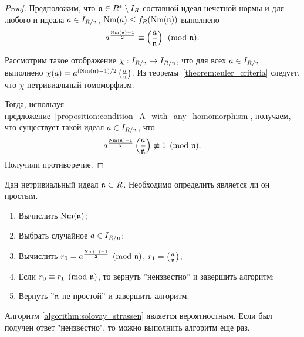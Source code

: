 \documentclass[_00_dissertation.tex]{subfiles}
\begin{document}
\begin{proof}
    Предположим, что $\mathfrak{n} \in R^{*} \setminus I_{R}$ составной идеал нечетной нормы и для любого и идеала $a \in I_{R/\mathfrak{n}}$, $\textrm{Nm}(a) \le f_R(\textrm{Nm}(\mathfrak{n}))$ выполнено
    \begin{equation*}
        a^{\frac{\textrm{Nm}(\mathfrak{n}) - 1}{2}} \equiv \left(\frac{a}{\mathfrak{n}}\right) \pmod{\mathfrak{n}}.
    \end{equation*}
    
    Рассмотрим такое отображение $\chi: I_{R/\mathfrak{n}} \to I_{R/\mathfrak{n}}$, что для всех $a \in I_{R/\mathfrak{n}}$ выполнено $\chi(a) = a^{(\textrm{Nm}(\mathfrak{n}) - 1)/2}\left(\frac{a}{\mathfrak{n}}\right)$.
    Из теоремы~\ref{theorem:euler_criteria} следует, что $\chi$ нетривиальный гомоморфизм.
    
    Тогда, используя предложение~\ref{proposition:condition_A_with_any_homomorphism}, получаем, что существует такой идеал $a \in I_{R/\mathfrak{n}}$, что
    \begin{equation*}
        a^{\frac{\textrm{Nm}(\mathfrak{n}) - 1}{2}} \left(\frac{a}{\mathfrak{n}}\right) \not\equiv 1 \pmod{\mathfrak{n}}.
    \end{equation*}
    Получили противоречие.
\end{proof}

\begin{algorithm}\label{algorithm:solovay_strassen}
    Дан нетривиальный идеал $\mathfrak{n} \subset R$.
    Необходимо определить является ли он простым.

    \begin{enumerate}
        \item Вычислить $\textrm{Nm}(\mathfrak{n})$;
        
        \item Выбрать случайное $a \in I_{R/\mathfrak{n}}$;

        \item Вычислить $r_0 = a^{\frac{\textrm{Nm}(\mathfrak{n}) - 1}{2}} \pmod{\mathfrak{n}}$, $r_1 = \left(\frac{a}{\mathfrak{n}}\right)$;

        \item Если $r_0 \equiv r_1 \pmod{\mathfrak{n}}$, то вернуть ''неизвестно'' и завершить алгоритм;

        \item Вернуть ''$\mathfrak{n}$ не простой'' и завершить алгоритм.
    \end{enumerate}
\end{algorithm}

\begin{remark}
    Алгоритм \ref{algorithm:solovay_strassen} является вероятностным.
    Если был получен ответ "неизвестно", то можно выполнить алгоритм еще раз.
\end{remark}
\end{document}
